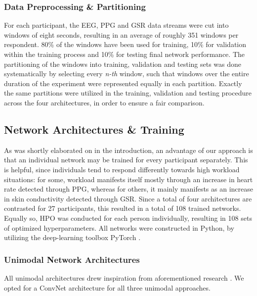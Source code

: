 \documentclass[fleqn,11pt]{paper}
\begin{document}
\subsubsection*{Data Preprocessing \& Partitioning}
For each participant, the EEG, PPG and GSR data streams were cut into windows of eight seconds, resulting in an average of roughly 351 windows per respondent. 80\% of the windows have been used for training, 10\% for validation within the training process and 10\% for testing final network performance. The partitioning of the windows into training, validation and testing sets was done systematically by selecting every \textit{n-th} window, such that windows over the entire duration of the experiment were represented equally in each partition.  Exactly the same partitions were utilized in the training, validation and testing procedure across the four architectures, in order to ensure a fair comparison.

\subsection{Network Architectures \& Training} \label{section:DNN}
As was shortly elaborated on in the introduction, an advantage of our approach is that an individual network may be trained for every participant separately.  This is helpful, since individuals tend to respond differently towards high workload situations: for some, workload manifests itself mostly through an increase in heart rate detected through PPG, whereas for others, it mainly manifests as an increase in skin conductivity detected through GSR. Since a total of four architectures are contrasted for 27 participants, this resulted in a total of 108 trained networks. Equally so, HPO was conducted for each person individually, resulting in 108 sets of optimized hyperparameters. All networks were constructed in Python, by utilizing the deep-learning toolbox PyTorch \cite{paszke2017automatic}. 

\subsubsection*{Unimodal Network Architectures}
All unimodal architectures drew inspiration from aforementioned research \cite{biswas2019cornet, dolmans2020perceived, schirrmeister2017deep, sun2019hybrid}. We opted for a ConvNet architecture for all three unimodal approaches.
\end{document}
